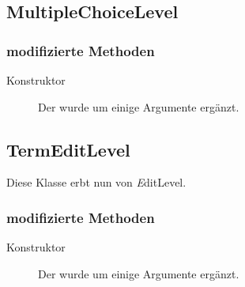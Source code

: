 \subsection{MultipleChoiceLevel}

	\subsubsection{modifizierte Methoden}
		\begin{description}
			\item[Konstruktor] Der wurde um einige Argumente ergänzt.
		\end{description}



\subsection{TermEditLevel}
	Diese Klasse erbt nun von \emph EditLevel.

	\subsubsection{modifizierte Methoden}
		\begin{description}
			\item[Konstruktor] Der wurde um einige Argumente ergänzt.
		\end{description}

